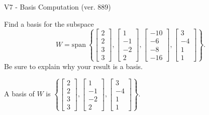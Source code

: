 \begin{exercise}
  \begin{exerciseTitle}V7 - Basis Computation (ver. 889)\end{exerciseTitle}
  \begin{exerciseStatement}
    Find a basis for the subspace 
\[W=\mathrm{span}\ \left\{\left[\begin{array}{r}
2 \\
2 \\
3 \\
3
\end{array}\right] , \left[\begin{array}{r}
1 \\
-1 \\
-2 \\
2
\end{array}\right] , \left[\begin{array}{r}
-10 \\
-6 \\
-8 \\
-16
\end{array}\right] , \left[\begin{array}{r}
3 \\
-4 \\
1 \\
1
\end{array}\right]\right\}.\]
 Be sure to explain why your result is a basis.


  \end{exerciseStatement}
  \begin{exerciseAnswer}
   A basis of \(W\) is  \(\left\{\left[\begin{array}{r}
2 \\
2 \\
3 \\
3
\end{array}\right] , \left[\begin{array}{r}
1 \\
-1 \\
-2 \\
2
\end{array}\right] , \left[\begin{array}{r}
3 \\
-4 \\
1 \\
1
\end{array}\right]\right\}\).
  


  \end{exerciseAnswer}
\end{exercise}